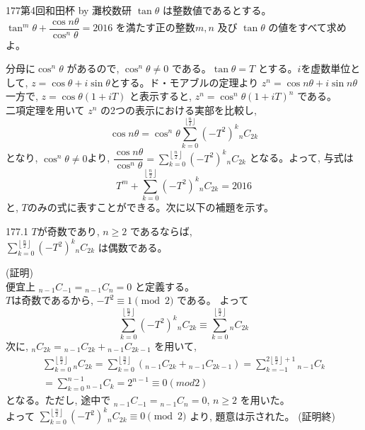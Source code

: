 \begin{prob}{177}{}{第4回和田杯 by 灘校数研}
 $\tan{\theta}$ は整数値であるとする。\\
 $\tan^m{\theta}+\dfrac{\cos{n\theta}}{\cos^n{\theta}}=2016$ を満たす正の整数$m,n$ 及び $\tan{\theta}$ の値をすべて求めよ。
\end{prob}

分母に$\cos^n{\theta}$ があるので, $\cos^n{\theta}\neq 0$ である。$\tan{\theta}=T$ とする。$i$を虚数単位として, $z=\cos{\theta}+i\sin{\theta}$とする。ド・モアブルの定理より $z^n=\cos{n\theta}+i\sin{n\theta}$\\
一方で, $z=\cos{\theta}\left(1+iT\right)$ と表示すると, $z^n=\cos^n{\theta}\left(1+iT \right)^n $ である。\\
二項定理を用いて $z^n$ の2つの表示における実部を比較し,
\[\cos{n\theta}=\cos^n{\theta}\displaystyle\sum_{k=0}^{\lfloor\frac{n}{2}\rfloor} (-T^2)^k{}_nC_{2k}\]
となり, $\cos^n{\theta}\neq 0$より, $\dfrac{\cos{n\theta}}{\cos^n{\theta}} = \displaystyle\sum_{k=0}^{\left\lfloor\frac{n}{2}\right\rfloor} (-T^2)^k{}_nC_{2k}$ となる。よって, 与式は
\[T^m+\displaystyle\sum_{k=0}^{\left\lfloor\frac{n}{2}\right\rfloor} (-T^2)^k{}_nC_{2k}=2016\] と, $T$のみの式に表すことができる。次に以下の補題を示す。

\begin{subthm}{177.1}
  $T$が奇数であり, $n\ge 2$ であるならば, \\
 $\displaystyle\sum_{k=0}^{\left\lfloor\frac{n}{2}\right\rfloor} (-T^2)^k{}_nC_{2k}$ は偶数である。
\end{subthm}

(証明) \\
便宜上 ${}_{n-1}C_{-1}={}_{n-1}C_{n}=0$ と定義する。\\
$T$は奇数であるから, $-T^2\equiv 1 \pmod{2}$ である。 よって
\[ \sum_{k=0}^{\left\lfloor\frac{n}{2}\right\rfloor} (-T^2)^k{}_nC_{2k}\equiv \displaystyle\sum_{k=0}^{\left\lfloor\frac{n}{2}\right\rfloor} {}_nC_{2k} \]
次に, ${}_nC_{2k} ={}_{n-1}C_{2k}+{}_{n-1}C_{2k-1}$ を用いて, 
\begin{eqnarray*}
 \displaystyle\sum_{k=0}^{\left\lfloor\frac{n}{2}\right\rfloor} {}_nC_{2k} =\displaystyle\sum_{k=0}^{\left\lfloor\frac{n}{2}\right\rfloor} ({}_{n-1}C_{2k}+{}_{n-1}C_{2k-1} )= \displaystyle\sum_{k=-1}^{2\left\lfloor\frac{n}{2} \right\rfloor +1} {}_{n-1}C_{k} \\
= \displaystyle\sum_{k=0}^{n-1} {}_{n-1}C_{k} =2^{n-1} \equiv 0 (mod 2)
\end{eqnarray*}
となる。ただし, 途中で ${}_{n-1}C_{-1}={}_{n-1}C_{n}=0$, $n\ge 2$ を用いた。\\
よって $\displaystyle\sum_{k=0}^{\left\lfloor\frac{n}{2}\right\rfloor} (-T^2)^k{}_nC_{2k}\equiv 0 \pmod{2}$ より, 題意は示された。   (証明終)


